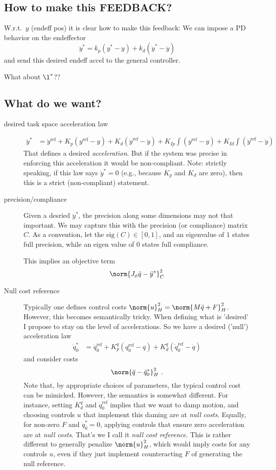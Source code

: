 \documentclass[10pt,fleqn,twoside]{article}
\newcommand{\rf}{{\text{ref}}}
\newcommand{\eig}{{\text{eig}}}
\begin{document}
{{\subsection{How to make this FEEDBACK?}

W.r.t.\ $y$ (endeff pos) it is clear how to make this feedback: We can
impose a PD behavior on the endeffector
$$ \ddot y^* = k_p (y^* - y) + k_d (\dot y^*-\dot y) $$
and send this desired endeff accel to the general controller.

What about $\l^*$??

\subsection{What do we want?}

\begin{description}
\item[desired task space acceleration law]
\begin{align}
\ddot y^*
 &= \ddot y^\rf + K_p(y^\rf-y) + K_d (\dot y^\rf -\dot y) + K_{Ip} \int (y^\rf-y) + K_{Id} \int (\dot y^\rf -\dot y)
\end{align}
That defines a desired \emph{acceleration}. But if the system was
precise in enforcing this acceleration it would be
non-compliant. Note: strictly speaking, if this law says $\ddot y^*=0$
(e.g., because $K_p$ and $K_d$ are zero), then this is a strict
(non-compliant) statement.

\item[precision/compliance]
Given a desried $\ddot y^*$, the precision along some
dimensions may not that important. We may capture this with the
precision (or compliance) matrix $C$. As a convention, let the
$\eig(C)\in[0,1]$, and an eigenvalue of $1$ states full precision,
while an eigen value of $0$ states full compliance.

This implies an objective term
$$\norm{J_\phi \ddot q - \ddot y^*}^2_C$$

\item[Null cost reference] Typically one defines control costs
  $\norm{u}^2_H = \norm{M \ddot q + F}^2_H$. However, this becomes
  semantically tricky. When defining what is 'desired' I propose to
  stay on the level of accelerations. So we have a desired ('null')
  acceleration law
\begin{align}
\ddot q_0^*
 &= \ddot q_0^\rf + K^q_p (q_0^\rf-q) + K^q_d (\dot q_0^\rf -\dot q)
\end{align}
and consider costs
$$\norm{\ddot q - \ddot q_0^*}^2_H ~.$$ Note that, by appropriate
choices of parameters, the typical control cost can be
mimicked. However, the semantics is somewhat different. For instance,
setting $K^q_d$ and $\dot q_0^\rf$ implies that we want to damp
motion, and choosing controls $u$ that implement this daming are at
\emph{null costs}. Equally, for non-zero $F$ and $\ddot q_0^*=0$,
applying controls that ensure zero acceleration are at \emph{null
  costs}. That's we I call it \emph{null cost reference}. This is
rather different to generally penalize $\norm{u}^2_H$, which would
imply costs for any controls $u$, even if they just implement
counteracting $F$ of generating the null reference.


\end{description}}}
\end{document}
